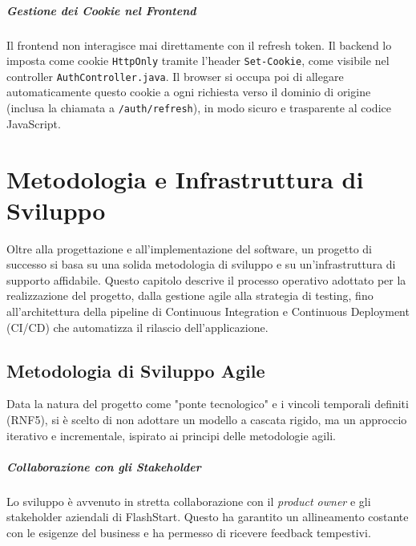 \documentclass[12pt,a4paper,openright,twoside]{book}
\begin{document}

\paragraph{Gestione dei Cookie nel Frontend}
Il frontend non interagisce mai direttamente con il refresh token. Il backend lo imposta come cookie \texttt{HttpOnly} tramite l'header \texttt{Set-Cookie}, come visibile nel controller \texttt{AuthController.java}. Il browser si occupa poi di allegare automaticamente questo cookie a ogni richiesta verso il dominio di origine (inclusa la chiamata a \texttt{/auth/refresh}), in modo sicuro e trasparente al codice JavaScript.


\chapter{Metodologia e Infrastruttura di Sviluppo}
\label{chap:metodologia}

Oltre alla progettazione e all'implementazione del software, un progetto di successo si basa su una solida metodologia di sviluppo e su un'infrastruttura di supporto affidabile. Questo capitolo descrive il processo operativo adottato per la realizzazione del progetto, dalla gestione agile alla strategia di testing, fino all'architettura della pipeline di Continuous Integration e Continuous Deployment (CI/CD) che automatizza il rilascio dell'applicazione.

\section{Metodologia di Sviluppo Agile}
\label{sec:metodologia_agile}

Data la natura del progetto come "ponte tecnologico" e i vincoli temporali definiti (RNF5), si è scelto di non adottare un modello a cascata rigido, ma un approccio iterativo e incrementale, ispirato ai principi delle metodologie agili.

\paragraph{Collaborazione con gli Stakeholder} Lo sviluppo è avvenuto in stretta collaborazione con il \textit{product owner} e gli stakeholder aziendali di FlashStart. Questo ha garantito un allineamento costante con le esigenze del business e ha permesso di ricevere feedback tempestivi.
\end{document}
